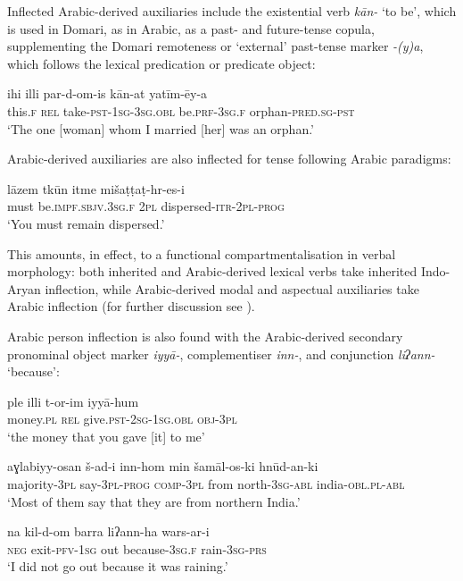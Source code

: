 \documentclass[output=paper]{langsci/langscibook}
\begin{document}
Inflected Arabic-derived auxiliaries include the existential verb \textit{kān-} ‘to be’, which is used in Domari, as in Arabic, as a past- and future-tense copula, supplementing the Domari remoteness or ‘external’ past-tense marker \textit{-(y)a}, which follows the lexical predication or predicate object:

\ea \gll ihi illi par-d-om-is kān-at yatīm-ēy-a\\
     this.\textsc{f} \textsc{rel} take-\textsc{pst-1sg-3sg.obl} be.\textsc{prf-3sg.f} orphan-\textsc{pred.sg-pst}\\
\glt ‘The one [woman] whom I married [her] was an orphan.’ \label{ihi}
\z

\noindent Arabic-derived auxiliaries are also inflected for tense following Arabic paradigms:

\ea \gll   lāzem tkūn itme mišaṭṭaṭ-hr-es-i\\
       must be.\textsc{impf.sbjv.3sg.f} \textsc{2pl} dispersed-\textsc{itr-2pl-prog}\\
\glt   ‘You must remain dispersed.’
\z

This amounts, in effect, to a functional compartmentalisation in verbal morphology: both inherited and Arabic-derived lexical verbs take inherited Indo-Aryan inflection, while Arabic-derived modal and aspectual auxiliaries take Arabic inflection (for further discussion see \citealt{Matras2015}).

Arabic person inflection is also found with the Arabic-derived secondary pronominal object marker \textit{iyyā-}, complementiser \textit{inn-}, and conjunction \textit{liʔann-} ‘because’:

\ea \gll   ple illi t-or-im iyyā-hum\\
       money.\textsc{pl} \textsc{rel} give.\textsc{pst-2sg-1sg.obl} \textsc{obj-3pl}\\
\glt   ‘the money that you gave [it] to me’ \label{ple}
\z

\ea\label{most}
\gll aɣlabiyy-osan š-ad-i inn-hom min šamāl-os-ki hnūd-an-ki\\
     majority-\textsc{3pl} say-\textsc{3pl-prog} \textsc{comp-3pl} from        north-\textsc{3sg-abl} india-\textsc{obl.pl-abl}\\
\glt   ‘Most of them say that they are from northern India.’
\z

\ea \gll na kil-d-om barra liʔann-ha wars-ar-i\\
       \textsc{neg} exit-\textsc{pfv-1sg} out because-\textsc{3sg.f} rain-\textsc{3sg-prs}\\
\glt   ‘I did not go out because it was raining.’\label{barra}
\z
\end{document}
